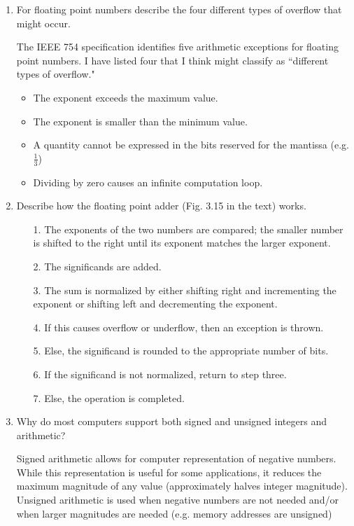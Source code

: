\documentclass[]{3330hw}
\begin{document}
\begin{enumerate}
\item For floating point numbers describe the four different types of overflow that might occur.

The IEEE 754 specification identifies five arithmetic exceptions for floating point numbers. I have listed four that I think might classify as ``different types of overflow." 

\begin{itemize}
	\item The exponent exceeds the maximum value.
	\item The exponent is smaller than the minimum value.
	\item A quantity cannot be expressed in the bits reserved for the mantissa (e.g. $\frac{1}{3}$)
	\item Dividing by zero causes an infinite computation loop. 
\end{itemize}

\item Describe how the floating point adder (Fig. 3.15 in the text) works.

\begin{enumerate}
    \item [1.] The exponents of the two numbers are compared; the smaller number is shifted to the right until its exponent matches the larger exponent.
	\item [2.]The significands are added.
	\item [3.] The sum is normalized by either shifting right and incrementing the exponent or shifting left and decrementing the exponent.  
	\item [4.] If this causes overflow or underflow, then an exception is thrown. 
	\item [5.] Else, the significand is rounded to the appropriate number of bits.
	\item [6.] If the significand is not normalized, return to step three.
	\item [7.] Else, the operation is completed. 
\end{enumerate}

\item Why do most computers support both signed and unsigned integers and arithmetic?

Signed arithmetic allows for computer representation of negative numbers. While this representation is useful for some applications, it reduces the maximum magnitude of any value (approximately halves integer magnitude). Unsigned arithmetic is used when negative numbers are not needed and/or when larger magnitudes are needed (e.g. memory addresses are unsigned)  



\end{enumerate}
\end{document}
